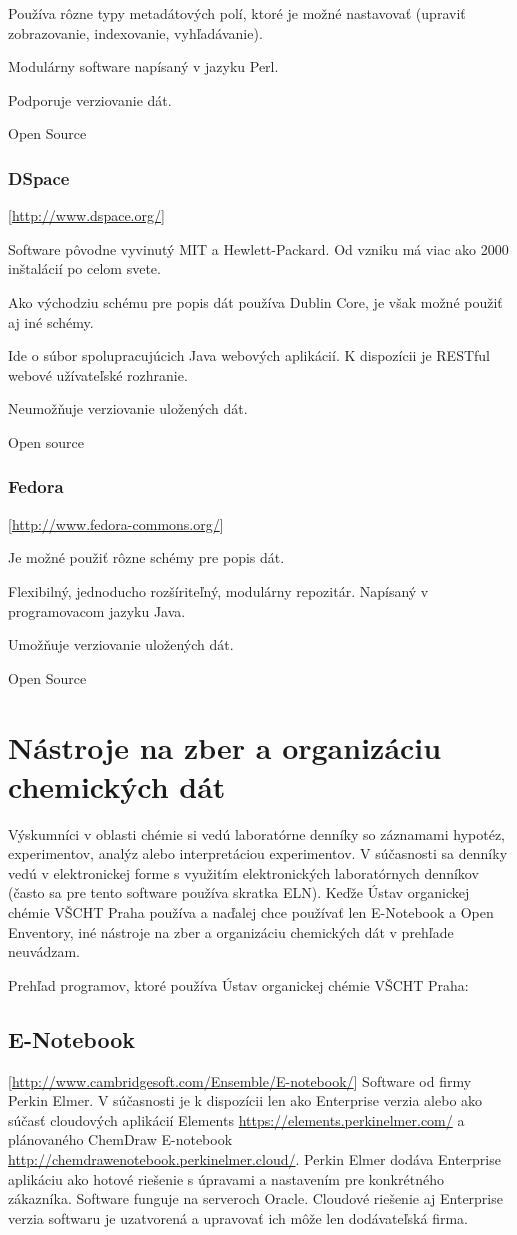 \documentclass[thesis=M,slovak]{FITthesis}[2013/05/06]
\begin{document}
Používa rôzne typy metadátových polí, ktoré je možné nastavovať (upraviť zobrazovanie, indexovanie, vyhľadávanie).

Modulárny software napísaný v jazyku Perl.

Podporuje verziovanie dát.

Open Source

\subsubsection {DSpace} [\url{http://www.dspace.org/}]

Software pôvodne vyvinutý MIT a Hewlett-Packard. Od vzniku má viac ako 2000 inštalácií po celom svete. 

Ako východziu schému pre popis dát používa Dublin Core, je však možné použiť aj iné schémy.

Ide o súbor spolupracujúcich Java webových aplikácií. K dispozícii je RESTful webové užívateľské rozhranie.

Neumožňuje verziovanie uložených dát.

Open source

\subsubsection {Fedora} [\url{http://www.fedora-commons.org/}]

Je možné použiť rôzne schémy pre popis dát.

Flexibilný, jednoducho rozšíriteľný, modulárny repozitár. Napísaný v programovacom jazyku Java.

Umožňuje verziovanie uložených dát.

Open Source


\section{Nástroje na zber a organizáciu chemických dát}
Výskumníci v oblasti chémie si vedú laboratórne denníky so záznamami hypotéz, experimentov, analýz alebo interpretáciou experimentov. V súčasnosti sa denníky vedú v elektronickej forme s využitím elektronických laboratórnych denníkov (často sa pre tento software používa skratka ELN). Keďže Ústav organickej chémie VŠCHT Praha používa a naďalej chce používať len E-Notebook a Open Enventory, iné nástroje na zber a organizáciu chemických dát v prehľade neuvádzam.

Prehľad programov, ktoré používa Ústav organickej chémie VŠCHT Praha:
\subsection{E-Notebook} [\url{http://www.cambridgesoft.com/Ensemble/E-notebook/}]
Software od firmy Perkin Elmer. V súčasnosti je k dispozícii len ako Enterprise verzia alebo ako súčasť cloudových aplikácií Elements \url{https://elements.perkinelmer.com/} a plánovaného ChemDraw E-notebook \url{http://chemdrawenotebook.perkinelmer.cloud/}. Perkin Elmer dodáva Enterprise aplikáciu ako hotové riešenie s úpravami a nastavením pre konkrétného zákazníka. Software funguje na serveroch Oracle. Cloudové riešenie aj Enterprise verzia softwaru je uzatvorená a upravovať ich môže len dodávateľská firma.
\end{document}
